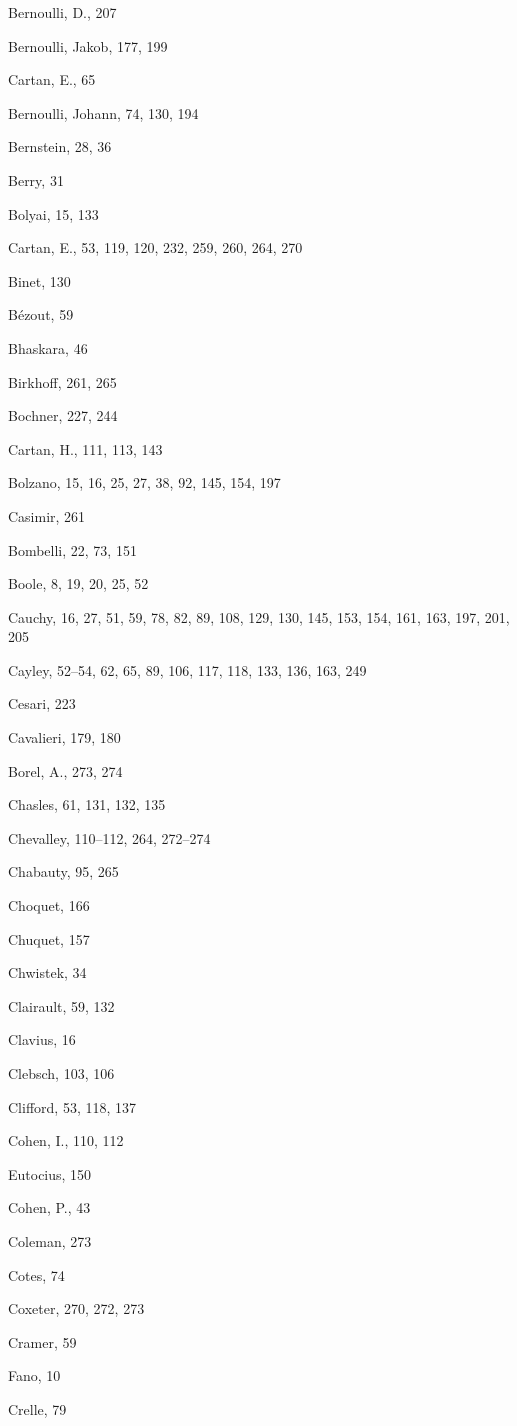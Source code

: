 Bernoulli, D., 207

Bernoulli, Jakob, 177, 199

Cartan, E., 65

Bernoulli, Johann, 74, 130, 194

Bernstein, 28, 36

Berry, 31

Bolyai, 15, 133

Cartan, E., 53, 119, 120, 232, 259, 260, 264, 270

Binet, 130

Bézout, 59

Bhaskara, 46

Birkhoff, 261, 265

Bochner, 227, 244

Cartan, H., 111, 113, 143

Bolzano, 15, 16, 25, 27, 38, 92, 145, 154, 197

Casimir, 261

Bombelli, 22, 73, 151

Boole, 8, 19, 20, 25, 52

Cauchy, 16, 27, 51, 59, 78, 82, 89, 108, 129, 130, 145, 153, 154, 161, 163, 197, 201, 205

Cayley, 52--54, 62, 65, 89, 106, 117, 118, 133, 136, 163, 249

Cesari, 223

Cavalieri, 179, 180

Borel, A., 273, 274

Chasles, 61, 131, 132, 135

Chevalley, 110--112, 264, 272--274

Chabauty, 95, 265

Choquet, 166

Chuquet, 157

Chwistek, 34

Clairault, 59, 132

Clavius, 16

Clebsch, 103, 106

Clifford, 53, 118, 137

Cohen, I., 110, 112

Eutocius, 150

Cohen, P., 43

Coleman, 273

Cotes, 74

Coxeter, 270, 272, 273

Cramer, 59

Fano, 10

Crelle, 79

